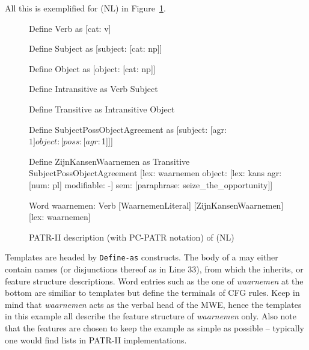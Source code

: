 \documentclass[output=paper]{langsci/langscibook}
\begin{document}
All this is exemplified for (NL)  in Figure~\ref{lic:fig:patr:dutch}.
\begin{figure}[p]
  \begin{patr-listing}
Define Verb as
    [cat: v]

Define Subject as
    [subject: [cat: np]]

Define Object as
    [object: [cat: np]]
    
Define Intransitive as
    Verb
    Subject
    
Define Transitive as
    Intransitive
    Object

Define SubjectPossObjectAgreement as
    [subject: [agr: $1]
    object: [poss: [agr: $1]]]

Define ZijnKansenWaarnemen as
    Transitive
    SubjectPossObjectAgreement
    [lex: waarnemen
     object: [lex: kans
              agr: [num: pl]
              modifiable: -]
    sem: [paraphrase: seize_the_opportunity]]

Word waarnemen:
    Verb
    {[WaarnemenLiteral] [ZijnKansenWaarnemen]}
    [lex: waarnemen]
  \end{patr-listing}
  \caption{PATR-II description (with PC-PATR notation) of (NL) }
  \label{lic:fig:patr:dutch}
\end{figure}
Templates are headed by \texttt{Define-as} constructs. The body of a  may either contain  names (or disjunctions thereof as in Line 33), from which the  inherits, or feature structure descriptions. Word entries such as the one of \textit{waarnemen} at the bottom are similiar to templates but define the terminals of CFG rules. Keep in mind that \textit{waarnemen} acts as the verbal head of the MWE, hence the templates in this example all describe the feature structure of \textit{waarnemen} only. Also note that the features are chosen to keep the example as simple as possible -- typically one would find  lists in PATR-II implementations.
\end{document}
